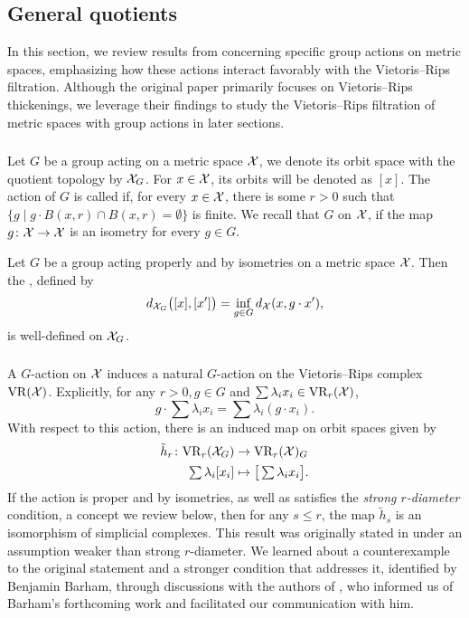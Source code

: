 
\subsection{General quotients}

In this section, we review results from \cite{adams2022metric} concerning specific group actions on metric spaces, emphasizing how these actions interact favorably with the Vietoris--Rips filtration.
Although the original paper primarily focuses on Vietoris--Rips thickenings, we leverage their findings to study the Vietoris--Rips filtration of metric spaces with group actions in later sections.

\subsubsection{}

Let $G$ be a group acting on a metric space $\mathcal{X}$, we denote its orbit space with the quotient topology by $\mathcal{X}_G$.
For $x \in \mathcal{X}$, its orbits will be denoted as $[x]$.
The action of $G$ is called  if, for every $x \in \mathcal{X}$, there is some $r>0$ such that $\{g \mid g\cdot B(x,r) \cap B(x,r) = \emptyset\}$ is finite.
We recall that $G$  on $\mathcal{X}$, if the map $g \colon \mathcal{X} \to \mathcal{X}$ is an isometry for every $g \in G$.

Let $G$ be a group acting properly and by isometries on a metric space $\mathcal{X}$.
Then the , defined by
\[
d_{\mathcal{X}_G}\big([x], [x']\big) = \inf_{g \in G} d_{\mathcal{X}}(x, g \cdot x'),
\]
is well-defined on $\mathcal{X}_G$.

\subsubsection{}\label{ss:h}

A \(G\)-action on $\mathcal{X}$ induces a natural \(G\)-action on the Vietoris--Rips complex $\mathrm{VR}(\mathcal{X})$.
Explicitly, for any \(r > 0, g\in G\) and $\sum \lambda_i x_i \in \mathrm{VR}_r(\mathcal{X})$,
\[
g \cdot \sum \lambda_i x_i = \sum \lambda_i (g\cdot x_i).
\]
With respect to this action, there is an induced map on orbit spaces given by
\begin{align*}
	\tilde h_r \colon \mathrm{VR}_r(\mathcal{X}_G) &\to \mathrm{VR}_r(\mathcal{X})_G \\
	\textstyle\sum\lambda_i [x_i] &\mapsto \textstyle \big[\sum\lambda_i x_i\big].
\end{align*}
If the action is proper and by isometries, as well as satisfies the \textit{strong \(r\)-diameter} condition, a concept we review below, then for any \(s \leq r\), the map $\tilde{h}_s$ is an isomorphism of simplicial complexes.
This result was originally stated in \cite[Prop.~3.5]{adams2022metric} under an assumption weaker than strong \(r\)-diameter.
We learned about a counterexample to the original statement and a stronger condition that addresses it, identified by Benjamin Barham, through discussions with the authors of \cite{adams2022metric}, who informed us of Barham's forthcoming work and facilitated our communication with him.

